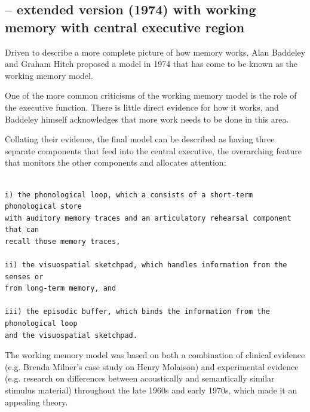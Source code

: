 \subsection{-- extended version (1974) with working memory with central executive region}

Driven to describe a more complete picture of how memory works, Alan Baddeley
and Graham Hitch proposed a model in 1974 that has come to be known as the
working memory model.

One of the more common criticisms of the working memory model is the role of the
executive function. There is little direct evidence for how it works, and
Baddeley himself acknowledges that more work needs to be done in this area.

Collating their evidence, the final model can be described as having three
separate components that feed into the central executive, the overarching
feature that monitors the other components and allocates attention:

\begin{verbatim}

i) the phonological loop, which a consists of a short-term phonological store
with auditory memory traces and an articulatory rehearsal component that can
recall those memory traces,

ii) the visuospatial sketchpad, which handles information from the senses or
from long-term memory, and

iii) the episodic buffer, which binds the information from the phonological loop
and the visuospatial sketchpad.
\end{verbatim}
The working memory model was based on both a combination of clinical evidence
(e.g. Brenda Milner’s case study on Henry Molaison) and experimental evidence
(e.g. research on differences between acoustically and semantically similar
stimulus material) throughout the late 1960s and early 1970s, which made it an
appealing theory.

